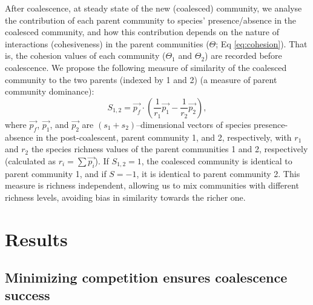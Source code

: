 \documentclass[10pt,letterpaper]{article}
\begin{document}
After coalescence, at steady state of the new (coalesced) community, we analyse the contribution of each parent community to species' presence/absence in the coalesced community, and how this contribution depends on the nature of interactions (cohesiveness) in the parent communities ($\Theta$; Eq \ref{eq:cohesion}). That is, the cohesion values of each community ($\Theta_1$ and $\Theta_2$) are recorded before coalescence. We propose the following measure of similarity of the coalesced community to the two parents (indexed by 1 and 2) (a measure of parent community dominance):
\begin{equation}\label{eq:similarity}
    S_{1,2} = \vec{p_f}\cdot\left(\dfrac{1}{r_1} \vec{p_1} - \dfrac{1}{r_2}\vec{p_2}\right), 
\end{equation}
where $\vec{p_f}$, $\vec{p_1}$, and $\vec{p_2}$ are $(s_1 + s_2)$--dimensional vectors of species presence-absence in the post-coalescent, parent community 1, and 2, respectively, with $r_1$ and $r_2$ the species richness values of the parent communities 1 and 2, respectively (calculated as $r_i = \sum \vec{p_i}$). If $S_{1,2} = 1$, the coalesced community is identical to parent community 1, and if $S = -1$, it is identical to parent community 2. This measure is richness independent, allowing us to mix communities with different richness levels, avoiding bias in similarity towards the richer one.

\section*{Results}

\subsection*{Minimizing competition ensures coalescence success}
\end{document}
